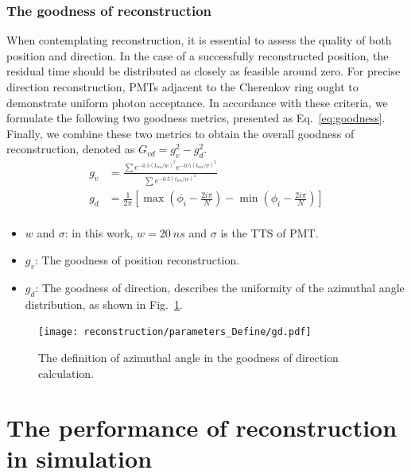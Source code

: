 \subsubsection{The goodness of reconstruction}
When contemplating reconstruction, it is essential to assess the quality of both position and direction. In the case of a successfully reconstructed position, the residual time should be distributed as closely as feasible around zero. For precise direction reconstruction, PMTs adjacent to the Cherenkov ring ought to demonstrate uniform photon acceptance. In accordance with these criteria, we formulate the following two goodness metrics, presented as Eq.~\eqref{eq:goodness}. Finally, we combine these two metrics to obtain the overall goodness of reconstruction, denoted as $G_{vd}=g_v^2-g_d^2$.
\begin{equation}
	\begin{aligned}
		g_v & = \frac{\sum e^{-0.5(t_{\mathrm{res}}/w)^2} e^{-0.5(t_{\mathrm{res}}/\sigma)^2}}{\sum e^{-0.5(t_{\mathrm{res}}/w)^2}}     \\
		g_d & = \frac{1}{2\pi} \left[ \max\left( \phi_i - \frac{2i\pi}{N} \right) - \min\left( \phi_i - \frac{2i\pi}{N} \right) \right] \\
	\end{aligned}
	\label{eq:goodness}
\end{equation}
\begin{itemize}
	\item $w$ and $\sigma$: in this work, $w=\SI{20}{ns}$ and $\sigma$ is the TTS of PMT.
	\item $g_v$: The goodness of position reconstruction.
	\item $g_d$: The goodness of direction, describes the uniformity of the azimuthal angle distribution, as shown in Fig.~\ref{fig:goodness}.
\end{itemize}
\begin{figure}
	\centering
	\texttt{[image: reconstruction/parameters\_Define/gd.pdf]}
	\caption{The definition of azimuthal angle in the goodness of direction calculation.}
	\label{fig:goodness}
\end{figure}
\section{The performance of reconstruction in simulation}

